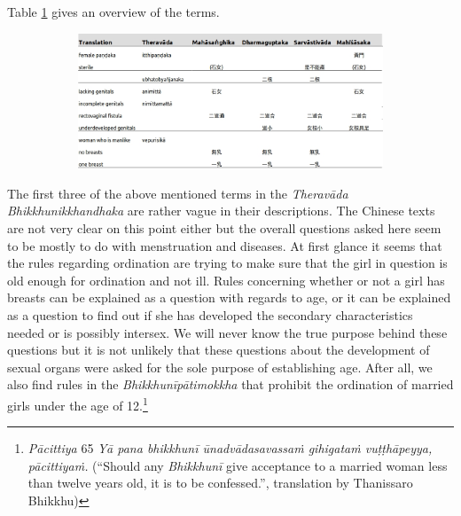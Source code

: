 Table \ref{female} gives an overview of the terms.

\begin{figure}[!htbp]
  \begin{subfigure}{\textwidth}
    \includegraphics[width=\textwidth]{female.jpg}
  \end{subfigure}
  \label{female}
\end{figure}

The first three of the above mentioned terms in the \textit{Theravāda} \textit{Bhikkhunikkhandhaka} are rather vague in their descriptions. The Chinese texts are not very clear on this point either but the overall questions asked here seem to be mostly to do with menstruation and diseases. At first glance it seems that the rules regarding ordination are trying to make sure that the girl in question is old enough for ordination and not ill. Rules concerning whether or not a girl has breasts can be explained as a question with regards to age, or it can be explained as a question to find out if she has developed the secondary characteristics needed or is possibly intersex. We will never know the true purpose behind these questions but it is not unlikely that these questions about the development of sexual organs were asked for the sole purpose of establishing age. After all, we also find rules in the \textit{Bhikkhunīpātimokkha} that prohibit the ordination of married girls under the age of 12.\footnote{\textit{Pācittiya} 65 \textit{Yā pana bhikkhunī ūnad­vāda­sa­vassaṁ gihigataṁ vuṭṭhāpeyya, pācittiyaṁ.} (``Should any \textit{Bhikkhunī} give acceptance to a married woman less than twelve years old, it is to be confessed.'', translation by Thanissaro Bhikkhu)} 


